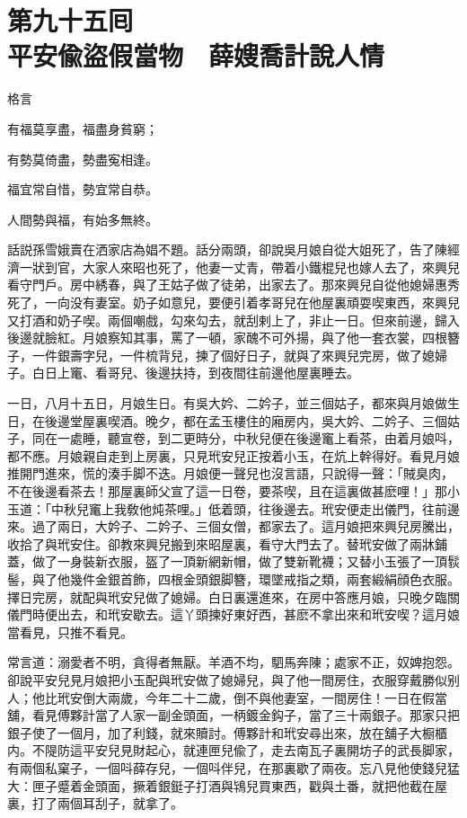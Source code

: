 
\chapter*{第九十五囘　\\平安偸盜假當物　薛嫂喬計說人情}


格言

\begin{myquote}
有福莫享盡，福盡身貧窮；

有勢莫倚盡，勢盡寃相逢。

福宜常自惜，勢宜常自恭。

人間勢與福，有始多無終。
\end{myquote}

話説孫雪娥賣在洒家店為娼不題。話分兩頭，卻說吳月娘自從大姐死了，告了陳經濟一狀到官，大家人來昭也死了，他妻一丈青，帶着小鐵棍兒也嫁人去了，來興兒看守門戶。房中綉春，與了王姑子做了徒弟，出家去了。那來興兒自從他媳婦惠秀死了，一向没有妻室。奶子如意兒，要便引着孝哥兒在他屋裏頑耍喫東西，來興兒又打酒和奶子喫。兩個嘲戲，勾來勾去，就刮剌上了，非止一日。但來前邊，歸入後邊就臉紅。月娘察知其事，罵了一頓，家醜不可外揚，與了他一套衣裳，四根簪子，一件銀壽字兒，一件梳背兒，揀了個好日子，就與了來興兒完房，做了媳婦子。白日上竃、看哥兒、後邊扶持，到夜間往前邊他屋裏睡去。

一日，八月十五日，月娘生日。有吳大妗、二妗子，並三個姑子，都來與月娘做生日，在後邊堂屋裏喫酒。晚夕，都在孟玉樓住的廂房内，吳大妗、二妗子、三個姑子，同在一處睡，聽宣卷，到二更時分，中秋兒便在後邊竃上看茶，由着月娘呌，都不應。月娘親自走到上房裏，只見玳安兒正按着小玉，在炕上幹得好。看見月娘推開門進來，慌的湊手脚不迭。月娘便一聲兒也沒言語，只說得一聲：「賊臭肉，不在後邊看茶去！那屋裏師父宣了這一日卷，要茶喫，且在這裏做甚麽哩！」那小玉道：「中秋兒竃上我敎他炖茶哩。」低着頭，往後邊去。玳安便走出儀門，往前邊來。過了兩日，大妗子、二妗子、三個女僧，都家去了。這月娘把來興兒房騰出，收拾了與玳安住。卻教來興兒搬到來昭屋裏，看守大門去了。替玳安做了兩牀鋪蓋，做了一身裝新衣服，盔了一頂新網新帽，做了雙新靴襪；又替小玉張了一頂䯼髻，與了他幾件金銀首飾，四根金頭銀脚簪，環墜戒指之類，兩套緞絹顔色衣服。擇日完房，就配與玳安兒做了媳婦。白日裏還進來，在房中答應月娘，只晚夕臨關儀門時便出去，和玳安歇去。這丫頭揀好東好西，甚麽不拿出來和玳安喫？這月娘當看見，只推不看見。

常言道：溺愛者不明，貪得者無厭。羊酒不均，駟馬奔陳；處家不正，奴婢抱怨。卻說平安兒見月娘把小玉配與玳安做了媳婦兒，與了他一間房住，衣服穿戴勝似别人；他比玳安倒大兩歲，今年二十二歲，倒不與他妻室，一間房住！一日在假當舖，看見傅夥計當了人家一副金頭面，一柄鍍金鈎子，當了三十兩銀子。那家只把銀子使了一個月，加了利錢，就來贖討。傅夥計和玳安尋出來，放在舖子大橱櫃内。不隄防這平安兒見財起心，就連匣兒偸了，走去南瓦子裏開坊子的武長脚家，有兩個私窠子，一個呌薛存兒，一個呌伴兒，在那裏歇了兩夜。忘八見他使錢兒猛大：匣子蹙着金頭面，撅着銀鋌子打酒與鴇兒買東西，戳與土番，就把他截在屋裏，打了兩個耳刮子，就拿了。

